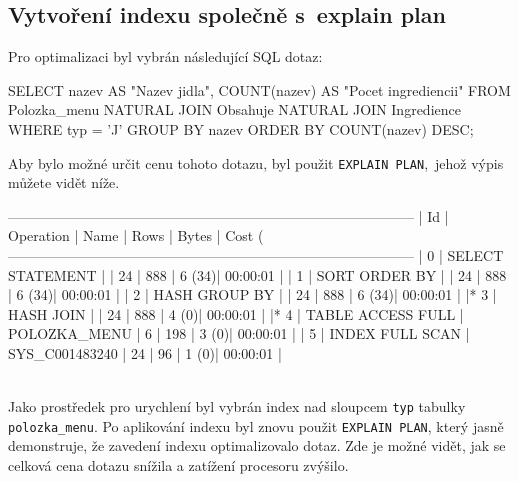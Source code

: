 \documentclass[11pt, a4paper]{article}
\begin{document}
\subsection{Vytvoření indexu společně s~explain plan}

Pro optimalizaci byl vybrán následující SQL dotaz:

\begin{verbnobox}[\footnotesize]
SELECT nazev AS "Nazev jidla", COUNT(nazev) AS "Pocet ingrediencii"
FROM Polozka_menu NATURAL JOIN Obsahuje NATURAL JOIN Ingredience
WHERE typ = 'J'
GROUP BY nazev
ORDER BY COUNT(nazev) DESC;
\end{verbnobox}

\noindent
\newpage
Aby bylo možné určit cenu tohoto dotazu, byl použit \texttt{EXPLAIN\,PLAN},\ jehož výpis můžete vidět níže.

\begin{verbnobox}[\scriptsize]
---------------------------------------------------------------------------------------
| Id  | Operation             | Name           | Rows  | Bytes | Cost (%
---------------------------------------------------------------------------------------                                 
|   0 | SELECT STATEMENT      |                |    24 |   888 |     6  (34)| 00:00:01 |                                
|   1 |  SORT ORDER BY        |                |    24 |   888 |     6  (34)| 00:00:01 |   
|   2 |   HASH GROUP BY       |                |    24 |   888 |     6  (34)| 00:00:01 |
|*  3 |    HASH JOIN          |                |    24 |   888 |     4   (0)| 00:00:01 |
|*  4 |     TABLE ACCESS FULL | POLOZKA_MENU   |     6 |   198 |     3   (0)| 00:00:01 |
|   5 |     INDEX FULL SCAN   | SYS_C001483240 |    24 |    96 |     1   (0)| 00:00:01 |
\end{verbnobox}
\noindent
\\[-8pt]
Jako prostředek pro urychlení byl vybrán index nad sloupcem \texttt{typ} tabulky \texttt{polozka\_menu}. Po aplikování indexu byl znovu použit \texttt{EXPLAIN PLAN}, který jasně demonstruje, že zavedení indexu optimalizovalo dotaz. Zde je možné vidět, jak se celková cena dotazu snížila a zatížení procesoru zvýšilo.
\end{document}
